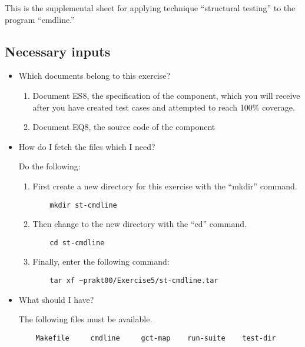 
This is the supplemental sheet 
for applying technique ``structural testing''
to the program ``cmdline.''

\subsection*{Necessary inputs}

\begin{itemize}

\item Which documents belong to this exercise?

\begin{enumerate}
\item Document ES8, the specification of the component, which you will
receive after you have created test cases and attempted to reach 100\%
coverage.
\item Document EQ8, the source code of the component
\end{enumerate}

\item How do I fetch the files which I need?

Do the following:

\begin{enumerate}

\item First create a new directory for this exercise with the
``mkdir'' command.
\begin{verbatim}
    mkdir st-cmdline
\end{verbatim}

\item Then change to the new directory with the ``cd'' command.
\begin{verbatim}
    cd st-cmdline
\end{verbatim}

\item Finally, enter the following command:
\begin{path}
\begin{verbatim}
    tar xf ~prakt00/Exercise5/st-cmdline.tar
\end{verbatim}
\end{path}

\end{enumerate}

\item What should I have?

The following files must be available.
\begin{verbatim}
    Makefile     cmdline     gct-map    run-suite    test-dir
\end{verbatim}

\end{itemize}


